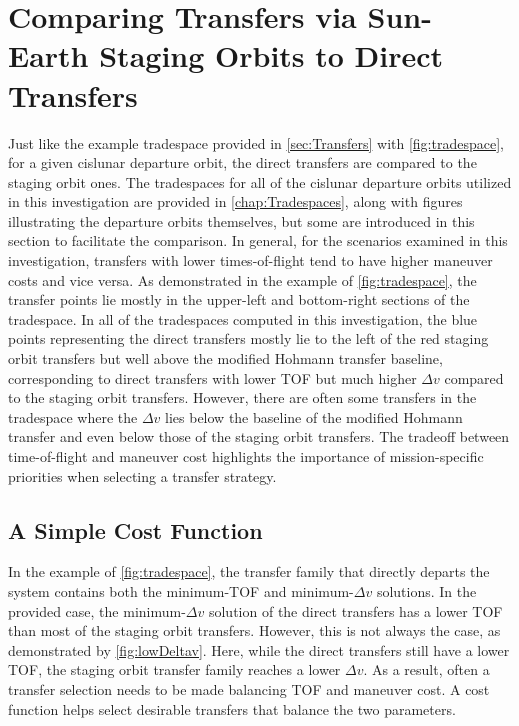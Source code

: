 \section{Comparing Transfers via Sun-Earth Staging Orbits to Direct Transfers}\label{sec:StagingComparison}
Just like the example tradespace provided in \cref{sec:Transfers} with \cref{fig:tradespace}, for a
given cislunar departure orbit, the direct transfers are compared to the staging orbit ones. The
tradespaces for all of the cislunar departure orbits utilized in this investigation are provided in
\cref{chap:Tradespaces}, along with figures illustrating the departure orbits themselves, but some
are introduced in this section to facilitate the comparison. In general, for the scenarios examined
in this investigation, transfers with lower times-of-flight tend to have higher maneuver costs and
vice versa. As demonstrated in the example of \cref{fig:tradespace}, the transfer points lie mostly
in the upper-left and bottom-right sections of the tradespace. In all of the tradespaces computed
in this investigation, the blue points representing the direct transfers mostly lie to the left of
the red staging orbit transfers but well above the modified Hohmann transfer baseline,
corresponding to direct transfers with lower TOF but much higher $\Delta v$ compared to the staging
orbit transfers. However, there are often some transfers in the tradespace where the $\Delta v$
lies below the baseline of the modified Hohmann transfer and even below those of the staging orbit
transfers. The tradeoff between time-of-flight and maneuver cost highlights the importance of
mission-specific priorities when selecting a transfer strategy.


\subsection{A Simple Cost Function}
In the example of \cref{fig:tradespace}, the transfer family that directly departs the system
contains both the minimum-TOF and minimum-$\Delta v$ solutions. In the provided case, the
minimum-$\Delta v$ solution of the direct transfers has a lower TOF than most of the staging orbit
transfers. However, this is not always the case, as demonstrated by \cref{fig:lowDeltav}. Here,
while the direct transfers still have a lower TOF, the staging orbit transfer family reaches a
lower $\Delta v$. As a result, often a transfer selection needs to be made balancing TOF and
maneuver cost. A cost function helps select desirable transfers that balance the two parameters.

